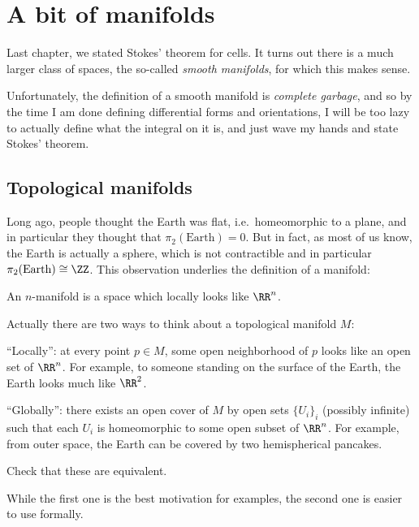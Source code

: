 \chapter{A bit of manifolds}
\label{ch:manifolds_diffgeo}
Last chapter, we stated Stokes' theorem for cells.
It turns out there is a much larger class of spaces,
the so-called \emph{smooth manifolds}, for which this makes sense.

Unfortunately, the definition of a smooth manifold is \emph{complete garbage},
and so by the time I am done defining differential forms and orientations,
I will be too lazy to actually define what the integral on it is,
and just wave my hands and state Stokes' theorem.

\section{Topological manifolds}

Long ago, people thought the Earth was flat,
i.e.\ homeomorphic to a plane, and in particular they thought that
$\pi_2(\text{Earth}) = 0$.
But in fact, as most of us know, the Earth is actually a sphere,
which is not contractible and in particular $\pi_2(\text{Earth}) \cong \ZZ$.
This observation underlies the definition of a manifold:
\begin{moral}
	An $n$-manifold is a space which locally looks like $\RR^n$.
\end{moral}
Actually there are two ways to think about a topological manifold $M$:
\begin{itemize}
	\ii ``Locally'': at every point $p \in M$,
	some open neighborhood of $p$ looks like an open set of $\RR^n$.
	For example, to someone standing on the surface of the Earth,
	the Earth looks much like $\RR^2$.

	\ii ``Globally'': there exists an open cover of $M$
	by open sets $\{U_i\}_i$ (possibly infinite) such that each $U_i$
	is homeomorphic to some open subset of $\RR^n$.
	For example, from outer space, the Earth can be covered
	by two hemispherical pancakes.
\end{itemize}
\begin{ques}
	Check that these are equivalent.
\end{ques}
While the first one is the best motivation for examples,
the second one is easier to use formally.

